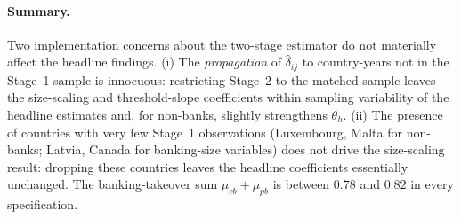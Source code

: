 \documentclass[\latexroot/\projectname]{subfiles}
\begin{document}
\paragraph{Summary.}
Two implementation concerns about the two-stage estimator do not materially affect the headline findings. (i) The \textit{propagation} of $\hat\delta_{ij}$ to country-years not in the Stage~1 sample is innocuous: restricting Stage~2 to the matched sample leaves the size-scaling and threshold-slope coefficients within sampling variability of the headline estimates and, for non-banks, slightly strengthens $\theta_h$. (ii) The presence of countries with very few Stage~1 observations (Luxembourg, Malta for non-banks; Latvia, Canada for banking-size variables) does not drive the size-scaling result: dropping these countries leaves the headline coefficients essentially unchanged. The banking-takeover sum $\mu_{cb}+\mu_{pb}$ is between $0.78$ and $0.82$ in every specification.

\smartbib
\end{document}
